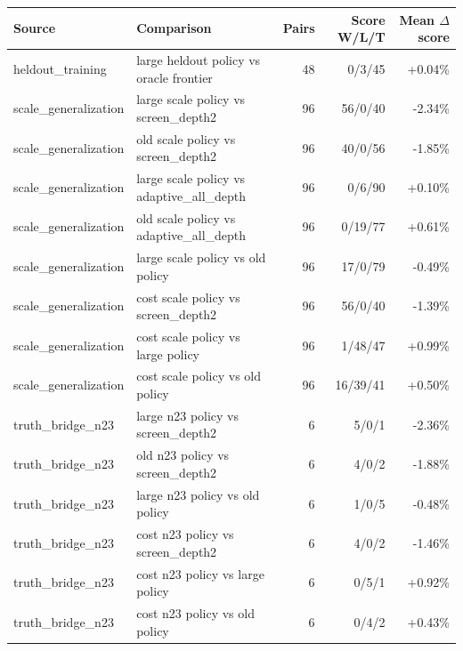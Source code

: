 \begin{tabular}{llrrr}
\toprule
Source & Comparison & Pairs & Score W/L/T & Mean $\Delta$ score \\
\midrule
heldout\_training & large heldout policy vs oracle frontier & 48 & 0/3/45 & +0.04\% \\
scale\_generalization & large scale policy vs screen\_depth2 & 96 & 56/0/40 & -2.34\% \\
scale\_generalization & old scale policy vs screen\_depth2 & 96 & 40/0/56 & -1.85\% \\
scale\_generalization & large scale policy vs adaptive\_all\_depth & 96 & 0/6/90 & +0.10\% \\
scale\_generalization & old scale policy vs adaptive\_all\_depth & 96 & 0/19/77 & +0.61\% \\
scale\_generalization & large scale policy vs old policy & 96 & 17/0/79 & -0.49\% \\
scale\_generalization & cost scale policy vs screen\_depth2 & 96 & 56/0/40 & -1.39\% \\
scale\_generalization & cost scale policy vs large policy & 96 & 1/48/47 & +0.99\% \\
scale\_generalization & cost scale policy vs old policy & 96 & 16/39/41 & +0.50\% \\
truth\_bridge\_n23 & large n23 policy vs screen\_depth2 & 6 & 5/0/1 & -2.36\% \\
truth\_bridge\_n23 & old n23 policy vs screen\_depth2 & 6 & 4/0/2 & -1.88\% \\
truth\_bridge\_n23 & large n23 policy vs old policy & 6 & 1/0/5 & -0.48\% \\
truth\_bridge\_n23 & cost n23 policy vs screen\_depth2 & 6 & 4/0/2 & -1.46\% \\
truth\_bridge\_n23 & cost n23 policy vs large policy & 6 & 0/5/1 & +0.92\% \\
truth\_bridge\_n23 & cost n23 policy vs old policy & 6 & 0/4/2 & +0.43\% \\
\bottomrule
\end{tabular}
